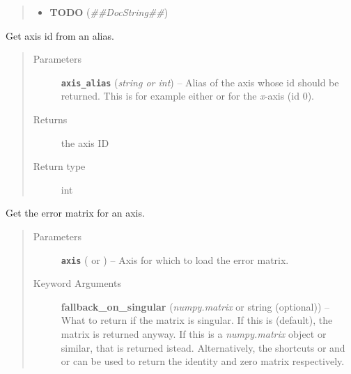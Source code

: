 \documentclass[a4paper,10pt,english]{sphinxmanual}
\begin{document}
\begin{fulllineitems}
\begin{fulllineitems}
\begin{quote}
\begin{description}
\begin{itemize}
\item {} 
\textbf{TODO} (\emph{\#\#DocString\#\#})

\end{itemize}


\end{description}\end{quote}

\end{fulllineitems}


\begin{fulllineitems}
\label{index:kafe.dataset.Dataset.get_axis}
Get axis id from an alias.
\begin{quote}\begin{description}
\item[{Parameters}] \leavevmode
\textbf{\texttt{axis\_alias}} (\emph{string or int}) -- Alias of the axis whose id should be returned. This is for example
either  or  for the \emph{x}-axis (id 0).

\item[{Returns}] \leavevmode
the axis ID

\item[{Return type}] \leavevmode
int

\end{description}\end{quote}

\end{fulllineitems}


\begin{fulllineitems}
\label{index:kafe.dataset.Dataset.get_cov_mat}
Get the error matrix for an axis.
\begin{quote}\begin{description}
\item[{Parameters}] \leavevmode
\textbf{\texttt{axis}} ( or ) -- Axis for which to load the error matrix.

\item[{Keyword Arguments}] \leavevmode
\textbf{fallback\_on\_singular} (\emph{numpy.matrix} or string (optional)) --
What to return if the matrix is singular. If this is 
(default), the matrix is returned anyway. If this is a
\emph{numpy.matrix} object or similar, that is returned istead.
Alternatively, the shortcuts  or  and 
or  can be used to return the identity and zero matrix
respectively.


\end{description}
\end{quote}
\end{fulllineitems}
\end{fulllineitems}
\end{document}
